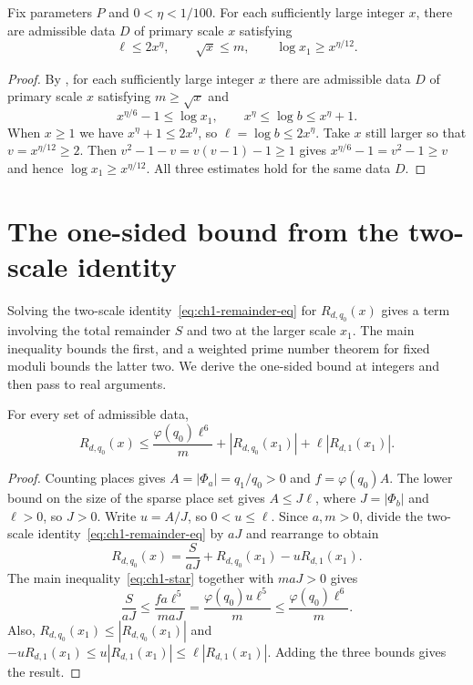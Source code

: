 \begin{lemma}
\label{lem:data-scales}
\emitthmsource
Fix parameters $P$ and $0<\eta<1/100$. For each sufficiently large integer $x$, there are admissible data $D$ of primary scale $x$ satisfying
\[
 \ell\le2x^\eta,\qquad \sqrt{x}\le m,\qquad
 \log x_1\ge x^{\eta/12}.
\]
\end{lemma}
\begin{proof}
By , for each sufficiently large integer $x$ there are admissible data $D$ of primary scale $x$ satisfying $m\ge\sqrt{x}$ and
\[
 x^{\eta/6}-1\le \log x_1,\qquad x^\eta\le\log b\le x^\eta+1.
\]
When $x\ge1$ we have $x^\eta+1\le2x^\eta$, so $\ell=\log b\le2x^\eta$. Take $x$ still larger so that $v=x^{\eta/12}\ge2$. Then $v^2-1-v=v(v-1)-1\ge1$ gives $x^{\eta/6}-1=v^2-1\ge v$ and hence $\log x_1\ge x^{\eta/12}$. All three estimates hold for the same data $D$.
\end{proof}

\section{The one-sided bound from the two-scale identity}
\label{sec:one-sided-bound}

Solving the two-scale identity~\eqref{eq:ch1-remainder-eq} for $R_{d,q_0}(x)$ gives a term involving the total remainder $S$ and two at the larger scale $x_1$. The main inequality bounds the first, and a weighted prime number theorem for fixed moduli bounds the latter two. We derive the one-sided bound at integers and then pass to real arguments.

\begin{lemma}
\label{lem:normalized}
\emitthmsource
For every set of admissible data,
\[
 R_{d,q_0}(x)\le\frac{\varphi(q_0)\ell^6}{m}
                     +|R_{d,q_0}(x_1)|+\ell|R_{d,1}(x_1)|.
\]
\end{lemma}
\begin{proof}
Counting places gives $A=|\Phi_a|=q_1/q_0>0$ and $f=\varphi(q_0)A$. The lower bound on the size of the sparse place set gives $A\le J\ell$, where $J=|\Phi_b|$ and $\ell>0$, so $J>0$. Write $u=A/J$, so $0<u\le\ell$. Since $a,m>0$, divide the two-scale identity~\eqref{eq:ch1-remainder-eq} by $aJ$ and rearrange to obtain
\[
 R_{d,q_0}(x)
 =\frac{S}{aJ}+R_{d,q_0}(x_1)-uR_{d,1}(x_1).
\]
The main inequality~\eqref{eq:ch1-star} together with $maJ>0$ gives
\[
 \frac{S}{aJ}\le\frac{fa\ell^5}{maJ}
   =\frac{\varphi(q_0)u\ell^5}{m}
   \le\frac{\varphi(q_0)\ell^6}{m}.
\]
Also, $R_{d,q_0}(x_1)\le |R_{d,q_0}(x_1)|$ and
$-uR_{d,1}(x_1)\le u|R_{d,1}(x_1)|\le\ell|R_{d,1}(x_1)|$. Adding the three bounds gives the result.
\end{proof}

